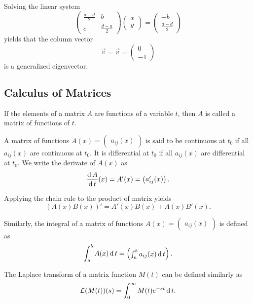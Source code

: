 Solving the linear system
\[
  \begin{pmatrix}
    \frac{a-d}{2} & b\\
    c & \frac{d-a}{2}
  \end{pmatrix}
  \begin{pmatrix}
    x \\ y
  \end{pmatrix} =
  \begin{pmatrix}
    -b \\ \frac{a-d}{2}
  \end{pmatrix}
\]
yields that the column vector
\[
  \vec{v}=\vec{v}=\begin{pmatrix}
  0\\ -1
\end{pmatrix}
\]
is a generalized eigenvector.

\subsection*{Calculus of Matrices}

If the elements of a matrix $A$ are functions of a variable $t$, then $A$ is called a matrix of functions of $t$.

A matrix of functions $A(x)=\begin{pmatrix} a_{ij}(x) \end{pmatrix}$ is said to be continuous at $t_0$ if all $a_{ij}(x)$ are continuous at $t_0$. It is differential at $t_0$ if all $a_{ij}(x)$ are differential at $t_0$. We write the derivate of $A(x)$ as
\[
  \dfrac{\operatorname{d} A}{\operatorname{d} t}(x)=A'(x)=\begin{pmatrix}
  a_{ij}'(x)
\end{pmatrix}.
\]

Applying the chain rule to the product of matrix yields
\[
(A(x)B(x))'=A'(x)B(x)+A(x)B'(x).  
\]

Similarly, the integral of a matrix of functions $A(x)=\begin{pmatrix}a_{ij}(x)\end{pmatrix}$ is defined as
\[
  \int_a^b A(x)\operatorname{d} t=\begin{pmatrix}
  \int_a^b a_{ij}(x)\operatorname{d} t
\end{pmatrix}.
\]

The Laplace transform of a matrix function $M(t)$ can be defined similarly as
\[\mathcal{L}(M(t))(s)=\int_0^\infty M(t)e^{-st}\operatorname{d} t.\]

